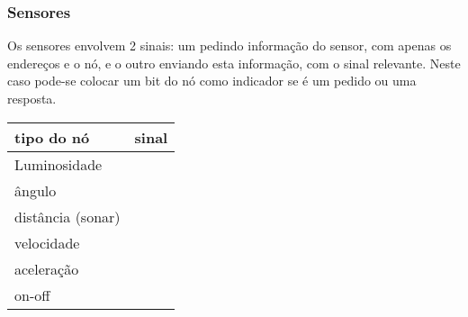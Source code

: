 \documentclass[11pt,	 papera4]{article}
\begin{document}
\newpage
\subsubsection{Sensores}
\label{sec-1.3.2}


Os sensores envolvem 2 sinais: um pedindo informação do sensor, com apenas os endereços e o nó, e o outro enviando esta informação, com o sinal relevante. Neste caso pode-se colocar um bit do nó como indicador se é um pedido ou uma resposta.


\begin{center}
\begin{tabular}{ll}
\hline
 tipo do nó         &  sinal  \\
\hline
 Luminosidade       &         \\
 ângulo             &         \\
 distância (sonar)  &         \\
 velocidade         &         \\
 aceleração         &         \\
 on-off             &         \\
\hline
\end{tabular}
\end{center}
\end{document}
